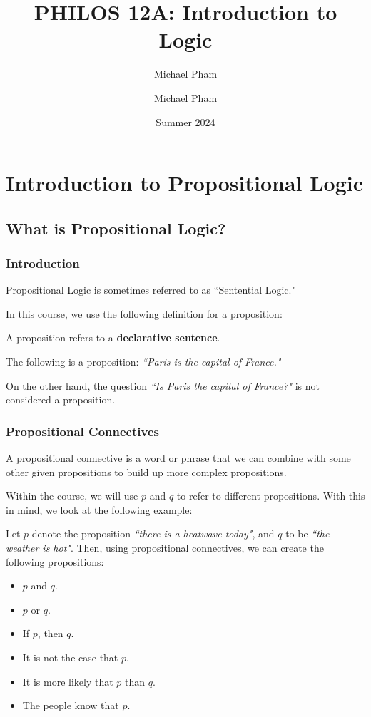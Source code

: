 \documentclass[openany]{book}
\title{#1}
\author{Michael Pham}
\date{#2}
\renewcommand{\mytitle}[2]{%
	\title{#1}
	\author{Michael Pham}
	\date{#2}
	\maketitle
	\newpage
	\mytoc
	\newpage
}
\begin{document}
\mytitle{PHILOS 12A: Introduction to Logic}{Summer 2024}

\chapter{Introduction to Propositional Logic}
\section{What is Propositional Logic?}
\subsection{Introduction}
Propositional Logic is sometimes referred to as ``Sentential Logic."

In this course, we use the following definition for a proposition:
\begin{defn}[Proposition]
	A proposition refers to a \textbf{declarative sentence}.
\end{defn}
\begin{example}
	The following is a proposition: \textit{``Paris is the capital of France."}
	
	On the other hand, the question \textit{``Is Paris the capital of France?"} is not considered a proposition.
\end{example}

\subsection{Propositional Connectives}
\begin{defn}
	A propositional connective is a word or phrase that we can combine with some other given propositions to build up more complex propositions.
\end{defn}

Within the course, we will use $p$ and $q$ to refer to different propositions. With this in mind, we look at the following example:
\begin{example}
	Let $p$ denote the proposition \textit{``there is a heatwave today"}, and $q$ to be \textit{``the weather is hot"}. Then, using propositional connectives, we can create the following propositions:
	\begin{itemize}
		\item $p$ and $q$.
		\item $p$ or $q$.
		\item If $p$, then $q$.
		\item It is not the case that $p$.
		\item It is more likely that $p$ than $q$.
		\item The people know that $p$.
	\end{itemize}
\end{example}
\end{document}
